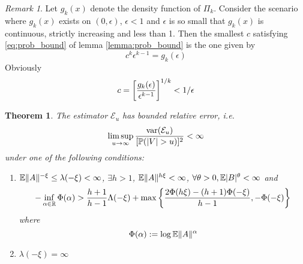 \documentclass{article}
\newtheorem{theorem}{Theorem}
\theoremstyle{remark}
\newtheorem{remark}{Remark}
\begin{document}
\begin{remark}\label{remark:inf_c}
  Let $g_k(x)$ denote the density function of $\Pi_k$. Consider the
  scenario where $g_k(x)$ exists on $(0, \epsilon)$, $\epsilon < 1$
  and $\epsilon$ is so small that $g_k(x)$ is continuous, strictly
  increasing and less than 1. Then the smallest $c$ satisfying
  \eqref{eq:prob_bound} of lemma \ref{lemma:prob_bound} is the one
  given by
  \[
  c^k \epsilon^{k-1} = g_k(\epsilon)
  \]
  Obviously
  \[
  c = \left[
    {g_k(\epsilon) \over \epsilon^{k-1}}
  \right]^{1/k} < 1/\epsilon
  \]
\end{remark}

\begin{theorem}
  The estimator $\mathcal E_u$ has bounded relative error, i.e.
  \begin{equation*}
    \limsup_{u \to \infty} {\text{var}(\mathcal E_u) \over [\mathbb{P}(|V| > u)]^2} < \infty
  \end{equation*}
  under one of the following conditions:
  \begin{enumerate}
  \item $\mathbb{E} \|A\|^{-\xi} \leq \lambda(-\xi) < \infty$, $\exists h > 1$,
    $\mathbb{E}\|A\|^{h\xi} < \infty$,
    $\forall \theta > 0, \mathbb{E} |B|^{\theta} < \infty$ and
    \begin{equation}
      \label{eq:deepness}
      -\inf_{\alpha \in \mathbb R} \Phi(\alpha)
      >
      {
        h+1
        \over
        h-1
      } \Lambda(-\xi)
      +
      \max\left\{
      {
        2 \Phi(h\xi) - (h+1) \Phi(-\xi)
        \over
        h-1
      },
      -\Phi(-\xi)
      \right\}
    \end{equation}
    where
    \[
    \Phi(\alpha) := \log \mathbb{E} \|A\|^{\alpha}
    \]
    \label{assumptions:1}
  \item $\lambda(-\xi) = \infty$
  \end{enumerate}
\end{theorem}
\end{document}
